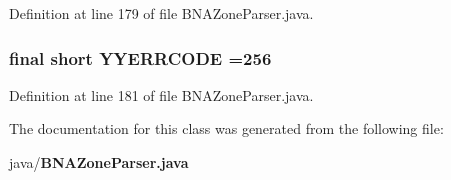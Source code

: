 Definition at line 179 of file B\+N\+A\+Zone\+Parser.\+java.

\subsubsection[{Y\+Y\+E\+R\+R\+C\+O\+D\+E}]{\setlength{\rightskip}{0pt plus 5cm}final short Y\+Y\+E\+R\+R\+C\+O\+D\+E =256\hspace{0.3cm}{\ttfamily [static]}}\label{classorg_1_1smallfoot_1_1parser_1_1zone_1_1BNAZoneParser_a1c58472ea6621d2f613831e08d10dba3}


Definition at line 181 of file B\+N\+A\+Zone\+Parser.\+java.



The documentation for this class was generated from the following file\+:\begin{DoxyCompactItemize}
\item 
java/{\bf B\+N\+A\+Zone\+Parser.\+java}\end{DoxyCompactItemize}
